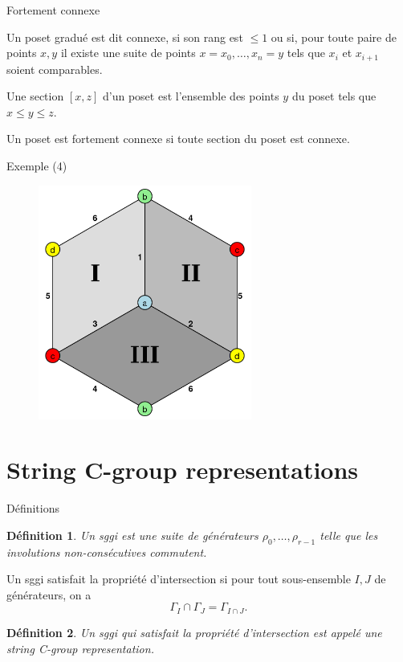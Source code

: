 \documentclass[10pt]{beamer}
\newtheorem{definition}{Définition}[section]
\begin{document}
\begin{frame}{Fortement connexe}

  Un poset gradué est dit connexe, si son rang est $\le 1$ ou si, pour toute paire de points $x, y$ il existe une suite de points $x = x_0, \dots, x_n = y$ tels que $x_i$ et $x_{i+1}$ soient comparables.

  Une section $[x,z]$ d'un poset est l'ensemble des points $y$ du poset tels que  $x \le y \le z$.

  Un poset est fortement connexe si toute section du poset est connexe.

\end{frame}

\begin{frame}{Exemple (4)}
  \begin{figure}[H]
    \begin{center}
      \includegraphics[width=7cm]{Hemicube.png}
    \end{center}
  \end{figure}
\end{frame}

\section{String C-group representations}

\begin{frame}{Définitions}
  \begin{definition}
    Un sggi est une suite de générateurs $\rho_0, \dots, \rho_{r-1}$ telle que les involutions non-consécutives commutent.
  \end{definition}


    Un sggi satisfait la propriété d'intersection si pour tout sous-ensemble $I, J$ de générateurs, on a
    \[
      \Gamma_{I} \cap \Gamma_{J} = \Gamma_{I \cap J}.
    \]

  \begin{definition}
    Un sggi qui satisfait la propriété d'intersection est appelé une string C-group representation.
  \end{definition}
\end{frame}
\end{document}
